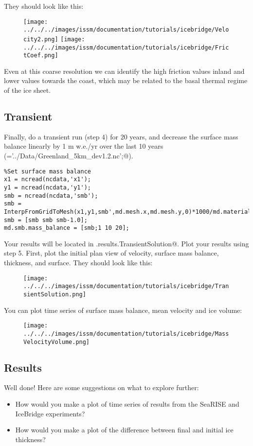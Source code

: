 They should look like this:
\begin{figure}[H]
	\begin{center}
		\texttt{[image: ../../../images/issm/documentation/tutorials/icebridge/Velocity2.png]}
		\texttt{[image: ../../../images/issm/documentation/tutorials/icebridge/FrictCoef.png]}
	\end{center}
\end{figure}
Even at this coarse resolution we can identify the high friction values inland and lower values towards the coast, which may be related to the basal thermal regime of the ice sheet.

\subsection{Transient} %
Finally, do a transient run (step 4) for 20 years, and decrease the surface mass balance linearly by 1 m w.e./yr over the last 10 years (\verb@ncdata='../Data/Greenland_5km_dev1.2.nc';@).
\begin{verbatim}%Set surface mass balance
x1 = ncread(ncdata,'x1');
y1 = ncread(ncdata,'y1');
smb = ncread(ncdata,'smb');
smb = InterpFromGridToMesh(x1,y1,smb',md.mesh.x,md.mesh.y,0)*1000/md.materials.rho_ice;
smb = [smb smb smb-1.0];
md.smb.mass_balance = [smb;1 10 20];\end{verbatim}

Your results will be located in \verb@md.results.TransientSolution@. Plot your results using step 5. First, plot the initial plan view of velocity, surface mass balance, thickness, and surface. They should look like this:
\begin{figure}[H]
	\begin{center}
		\texttt{[image: ../../../images/issm/documentation/tutorials/icebridge/TransientSolution.png]}
	\end{center}
\end{figure}
You can plot time series of surface mass balance, mean velocity and ice volume:
\begin{figure}[H]
	\begin{center}
		\texttt{[image: ../../../images/issm/documentation/tutorials/icebridge/MassVelocityVolume.png]}
	\end{center}
\end{figure}

\subsection{Results} %
Well done! Here are some suggestions on what to explore further:
\begin{itemize}
	\item How would you make a plot of time series of results from the SeaRISE and IceBridge experiments?
	\item How would you make a plot of the difference between final and initial ice thickness?
\end{itemize}
